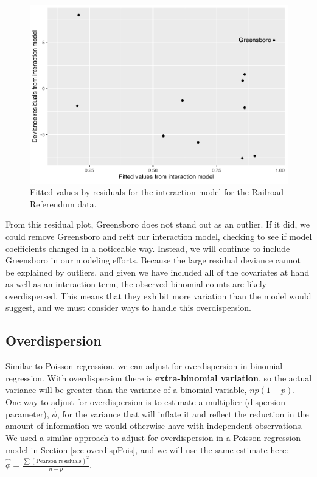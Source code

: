 \documentclass[
]{krantz}
\begin{document}
\begin{figure}

{\centering \includegraphics[width=0.6\linewidth]{bookdown-BeyondMLR_files/figure-latex/resid-1} 

}

\caption{Fitted values by residuals for the interaction model for the Railroad Referendum data.}\label{fig:resid}
\end{figure}

From this residual plot, Greensboro does not stand out as an outlier. If it did, we could remove Greensboro and refit our interaction model, checking to see if model coefficients changed in a noticeable way. Instead, we will continue to include Greensboro in our modeling efforts. Because the large residual deviance cannot be explained by outliers, and given we have included all of the covariates at hand as well as an interaction term, the observed binomial counts are likely overdispersed. This means that they exhibit more variation than the model would suggest, and we must consider ways to handle this overdispersion.

\hypertarget{sec-logOverdispersion}{%
\subsection{Overdispersion}\label{sec-logOverdispersion}}

Similar to Poisson regression, we can adjust for overdispersion  in binomial regression. With overdispersion there is \textbf{extra-binomial variation},  so the actual variance will be greater than the variance of a binomial variable, \(np(1-p)\). One way to adjust for overdispersion is to estimate a multiplier (dispersion parameter), \(\hat{\phi}\), for the variance that will inflate it and reflect the reduction in the amount of information we would otherwise have with independent observations. We used a similar approach to adjust for overdispersion in a Poisson regression model in Section \ref{sec-overdispPois}, and we will use the same estimate here: \(\hat\phi=\frac{\sum(\textrm{Pearson residuals})^2}{n-p}\).
\end{document}
